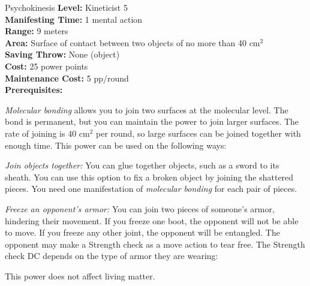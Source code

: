 {Psychokinesis}
{
	\textbf{Level:}
	Kineticist 5\\
	\textbf{Manifesting Time:}
	1 mental action\\
	\textbf{Range:}
	9 meters\\
	\textbf{Area:}
	Surface of contact between two objects of no more than 40 cm$^2$\\
	\textbf{Saving Throw:}
	None (object)\\
	\textbf{Cost:}
	25 power points\\
	\textbf{Maintenance Cost:}
	5 pp/round\\
	\textbf{Prerequisites:}
	\\
}
{
	\emph{Molecular bonding} allows you to join two surfaces at the molecular level. The bond is permanent, but you can maintain the power to join larger surfaces. The rate of joining is 40 cm$^2$ per round, so large surfaces can be joined together with enough time. This power can be used on the following ways:

	\begin{enumerate*}
		\item \textit{Join objects together:} You can glue together objects, such as a sword to its sheath. You can use this option to fix a broken object by joining the shattered pieces. You need one manifestation of \emph{molecular bonding} for each pair of pieces.

		\item \textit{Freeze an opponent's armor:} You can join two pieces of someone's armor, hindering their movement. If you freeze one boot, the opponent will not be able to move. If you freeze any other joint, the opponent will be entangled. The opponent may make a Strength check as a move action to tear free. The Strength check DC depends on the type of armor they are wearing:

	\end{enumerate*}

	This power does not affect living matter.
}